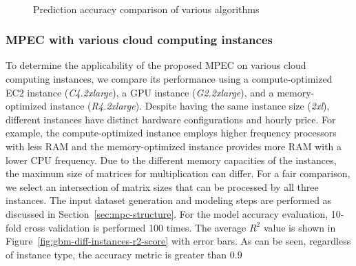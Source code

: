 \documentclass[10pt, conference, compsocconf]{IEEEtran}
\begin{document}
\begin{figure}[t]
  \centering
  \\
   \hfil {}
  \caption{\label{fig:algorithm-comparison}Prediction accuracy comparison of various algorithms}
\end{figure}

\subsubsection{MPEC with various cloud computing instances}
To determine the applicability of the proposed MPEC on various cloud computing instances, we compare its performance using a compute-optimized EC2 instance (\textit{C4.2xlarge}), a GPU instance (\textit{G2.2xlarge}), and a memory-optimized instance (\textit{R4.2xlarge}). Despite having the same instance size (\textit{2xl}), different instances have distinct hardware configurations and hourly price. For example, the compute-optimized instance employs higher frequency processors with less RAM and the memory-optimized instance provides more RAM with a lower CPU frequency. Due to the different memory capacities of the instances, the maximum size of matrices for multiplication can differ. For a fair comparison, we select an intersection of matrix sizes that can be processed by all three instances. The input dataset generation and modeling steps are performed as discussed in Section~\ref{sec:mpc-structure}. For the model accuracy evaluation, 10-fold cross validation is performed 100 times. The average $R^2$ value is shown in Figure~\ref{fig:gbm-diff-instances-r2-score} with error bars. As can be seen, regardless of instance type, the accuracy metric is greater than $0.9$ 
\end{document}
